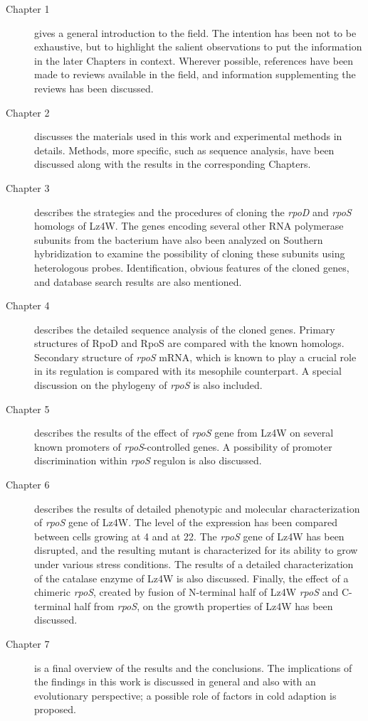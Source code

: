 \begin{description}

\item[Chapter 1] gives a general introduction to the field. The
intention has been not to be exhaustive, but to highlight the
salient observations to put the information in the later Chapters
in context. Wherever possible, references have been made to
reviews available in the field, and information supplementing the
reviews has been discussed.

\item[Chapter 2] discusses the materials used in this work and
experimental methods in details. Methods, more specific, such as
sequence analysis, have been discussed along with the results in
the corresponding Chapters.

\item[Chapter 3] describes the strategies and the procedures of
cloning the \emph{rpoD} and \emph{rpoS} homologs of 
Lz4W. The genes encoding several other RNA polymerase subunits
from the bacterium have also been analyzed on Southern
hybridization to examine the possibility of cloning these subunits
using heterologous probes. Identification, obvious features of the
cloned genes, and database search results are also mentioned.

\item[Chapter 4] describes the detailed sequence analysis of the
cloned genes. Primary structures of RpoD and RpoS are compared
with the known homologs. Secondary structure of \emph{rpoS} mRNA,
which is known to play a crucial role in its regulation is
compared with its mesophile counterpart. A special discussion on
the phylogeny of \emph{rpoS} is also included.

\item[Chapter 5] describes the results of the effect of
\emph{rpoS} gene from  Lz4W on several known promoters of
\emph{rpoS}-controlled  genes. A possibility of promoter
discrimination within \emph{rpoS} regulon is also discussed.

\item[Chapter 6] describes the results of detailed phenotypic and
molecular characterization of \emph{rpoS} gene of 
Lz4W\@. The level of the \sigs{} expression has been compared
between cells growing at 4\dg{} and at 22\dg{}\@. The \emph{rpoS}
gene of Lz4W has been disrupted, and the resulting mutant is
characterized for its ability to grow under various stress
conditions. The results of a detailed characterization of the
catalase enzyme of Lz4W is also discussed. Finally, the effect of
a chimeric \emph{rpoS}, created by fusion of N-terminal half of
Lz4W \emph{rpoS} and C-terminal half from  \emph{rpoS},
on the growth properties of Lz4W has been discussed.

\item[Chapter 7] is a final overview of the results and the
conclusions. The implications of the findings in this work is
discussed in general and also with an evolutionary perspective; a
possible role of \s{} factors in cold adaption is proposed.


\end{description}

